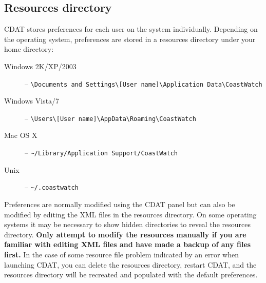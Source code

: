 \subsection{Resources directory}
\label{resources}

CDAT stores preferences for each user on the system individually.
Depending on the operating system, preferences are stored in a
resources directory under your home directory:
\begin{description}

\item[Windows 2K/XP/2003] -- \verb+\Documents and Settings\[User name]\Application Data\CoastWatch+

\item[Windows Vista/7] -- \verb+\Users\[User name]\AppData\Roaming\CoastWatch+

\item[Mac OS X] -- \verb+~/Library/Application Support/CoastWatch+

\item[Unix] -- \verb+~/.coastwatch+

\end{description}
Preferences are normally modified using the CDAT
 panel but can also be modified
by editing the XML files in the resources directory.  On some
operating systems it may be necessary to show hidden directories
to reveal the resources directory.  {\bf Only attempt to modify
the resources manually if you are familiar with editing XML files
and have made a backup of any files first.}  In the case of some
resource file problem indicated by an error when launching CDAT,
you can delete the resources directory, restart CDAT, and the
resources directory will be recreated and populated with the
default preferences.

